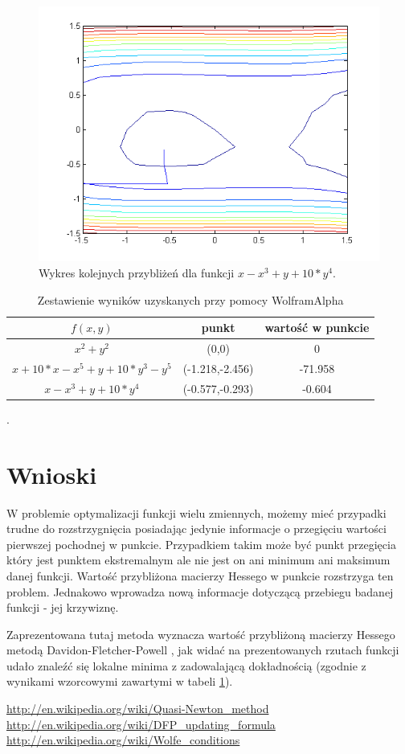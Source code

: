 \documentclass{classrep}
\begin{document}
\begin{figure}[H]
\centering
\includegraphics[width=12cm]{fcja3} 
\caption{Wykres kolejnych przybliżeń dla funkcji $x - x^3 +y+10*y^4$.}
\label{fig:funkcja32}
\end{figure}

\begin{table}[H]
	\begin{center}
	\begin{tabular}{|c|c|c|}
	\hline $f(x,y)$ & punkt & wartość w punkcie \\ 
	\hline $x^2+y^2$ & (0,0) & 0 \\ 
	\hline $x + 10*x - x^5 + y + 10*y^3 - y^5$ & (-1.218,-2.456) & -71.958 \\ 
	\hline $x - x^3 +y+10*y^4$ & (-0.577,-0.293) & -0.604 \\ 
	\hline 
	\end{tabular}
	\caption{Zestawienie wyników uzyskanych przy pomocy WolframAlpha }.
	\label{wolfram}
	\end{center}
\end{table}
\section{Wnioski}
W problemie optymalizacji funkcji wielu zmiennych, możemy mieć przypadki trudne do rozstrzygnięcia posiadając jedynie informacje o przegięciu wartości pierwszej pochodnej w punkcie. Przypadkiem takim może być punkt przegięcia który jest punktem ekstremalnym ale nie jest on ani minimum ani maksimum danej funkcji. Wartość przybliżona macierzy Hessego w punkcie rozstrzyga ten problem. Jednakowo wprowadza nową informacje dotyczącą przebiegu badanej funkcji - jej krzywiznę.

Zaprezentowana tutaj metoda wyznacza wartość przybliżoną macierzy Hessego metodą Davidon-Fletcher-Powell \cite{2}, jak widać na prezentowanych rzutach funkcji udało znaleźć się lokalne minima z zadowalającą dokładnością (zgodnie z wynikami wzorcowymi zawartymi w tabeli \ref{wolfram}).

\begin{thebibliography}{9}
 \url{http://en.wikipedia.org/wiki/Quasi-Newton_method}
 \url{http://en.wikipedia.org/wiki/DFP_updating_formula}
 \url{http://en.wikipedia.org/wiki/Wolfe_conditions}
\end{thebibliography}
\end{document}

